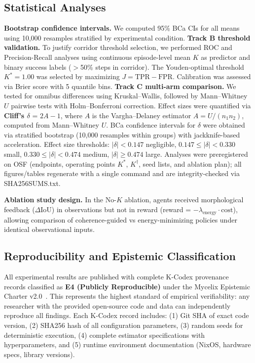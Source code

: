 \documentclass[10pt,letterpaper]{article}
\begin{document}
\subsection*{Statistical Analyses}

\textbf{Bootstrap confidence intervals.} We computed 95\% BCa CIs for all means using 10,000 resamples stratified by experimental condition. \textbf{Track B threshold validation.} To justify corridor threshold selection, we performed ROC and Precision-Recall analyses using continuous episode-level mean $K$ as predictor and binary success labels ($>$50\% steps in corridor). The Youden-optimal threshold $K^* = 1.00$ was selected by maximizing $J = \text{TPR} - \text{FPR}$. Calibration was assessed via Brier score with 5 quantile bins. \textbf{Track C multi-arm comparison.} We tested for omnibus differences using Kruskal–Wallis, followed by Mann–Whitney $U$ pairwise tests with Holm–Bonferroni correction. Effect sizes were quantified via \textbf{Cliff's $\delta$} = $2A - 1$, where $A$ is the Vargha–Delaney estimator $A = U/(n_1 n_2)$, computed from Mann–Whitney $U$. BCa confidence intervals for $\delta$ were obtained via stratified bootstrap (10,000 resamples within groups) with jackknife-based acceleration. Effect size thresholds: $|\delta| < 0.147$ negligible, $0.147 \le |\delta| < 0.330$ small, $0.330 \le |\delta| < 0.474$ medium, $|\delta| \ge 0.474$ large. Analyses were preregistered on OSF (endpoints, operating points $K^*$, $K^\dagger$, seed lists, and ablation plan); all figures/tables regenerate with a single command and are integrity-checked via SHA256SUMS.txt.

\textbf{Ablation study design.} In the No-$K$ ablation, agents received morphological feedback ($\Delta$IoU) in observations but not in reward (reward = $-\lambda_{\text{energy}} \cdot \text{cost}$), allowing comparison of coherence-guided vs energy-minimizing policies under identical observational inputs.

\subsection*{Reproducibility and Epistemic Classification}

All experimental results are published with complete K-Codex provenance records classified as \textbf{E4 (Publicly Reproducible)} under the Mycelix Epistemic Charter v2.0~\cite{mycelix2025epistemic}. This represents the highest standard of empirical verifiability: any researcher with the provided open-source code and data can independently reproduce all findings. Each K-Codex record includes: (1) Git SHA of exact code version, (2) SHA256 hash of all configuration parameters, (3) random seeds for deterministic execution, (4) complete estimator specifications with hyperparameters, and (5) runtime environment documentation (NixOS, hardware specs, library versions).
\end{document}
